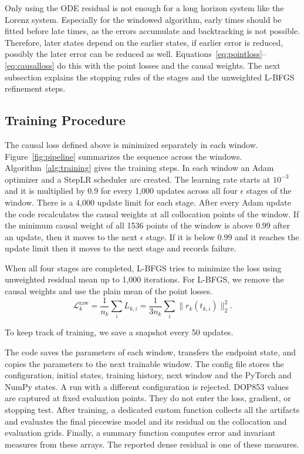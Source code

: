 \documentclass[conference]{IEEEtran}
\begin{document}
Only using the ODE residual is not enough for a long horizon system like the Lorenz system. Especially for the windowed algorithm, early times should be fitted before late times, as the errors accumulate and backtracking is not possible. Therefore, later states depend on the earlier states, if earlier error is reduced, possibly the later error can be reduced as well. Equations~\eqref{eq:pointloss}--\eqref{eq:causalloss} do this with the point losses and the causal weights. The next subsection explains the stopping rules of the stages and the unweighted L-BFGS refinement steps.

\subsection{Training Procedure}

The causal loss defined above is minimized separately in each window. Figure~\ref{fig:pipeline} summarizes the sequence across the windows. Algorithm~\ref{alg:training} gives the training steps. In each window an Adam optimizer and a StepLR scheduler are created. The learning rate starts at $10^{-3}$ and it is multiplied by 0.9 for every 1,000 updates across all four $\epsilon$ stages of the window. There is a 4,000 update limit for each stage. After every Adam update the code recalculates the causal weights at all collocation points of the window. If the minimum causal weight of all 1536 points of the window is above 0.99 after an update, then it moves to the next $\epsilon$ stage. If it is below 0.99 and it reaches the update limit then it moves to the next stage and records failure.

When all four stages are completed, L-BFGS tries to minimize the loss using unweighted residual mean up to 1,000 iterations. For L-BFGS, we remove the causal weights and use the plain mean of the point losses.
\[
\mathcal{L}^{\mathrm{raw}}_k
=\frac{1}{n_k}\sum_i L_{k,i}
=\frac{1}{3n_k}\sum_i\|r_k(t_{k,i})\|_2^2.
\]

To keep track of training, we save a snapshot every 50 updates.

The code saves the parameters of each window, transfers the endpoint state, and copies the parameters to the next trainable window. The config file stores the configuration, initial states, training history, next window and the PyTorch and NumPy states. A run with a different configuration is rejected. DOP853 values are captured at fixed evaluation points. They do not enter the loss, gradient, or stopping test. After training, a dedicated custom function collects all the artifacts and evaluates the final piecewise model and its residual on the collocation and evaluation grids. Finally, a summary function computes error and invariant measures from these arrays. The reported dense residual is one of these measures.
\end{document}
